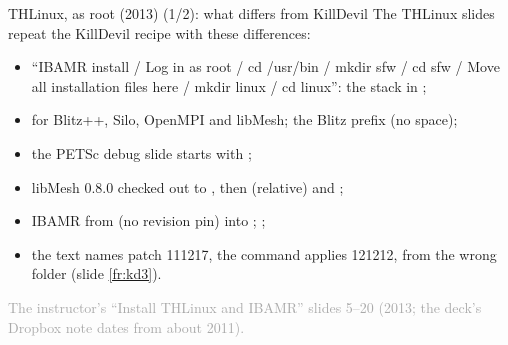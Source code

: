 \documentclass[aspectratio=169,11pt]{beamer}
\newcommand{\sourcecredit}[1]{\vfill\begin{flushright}\tiny\textcolor{DarkGray}{#1}\end{flushright}}
\begin{document}
\begin{frame}{THLinux, as root (2013) (1/2): what differs from KillDevil}
\label{fr:throot}
\small The THLinux slides repeat the KillDevil recipe with these differences:
\begin{itemize}\setlength{\itemsep}{2pt}
  \item ``IBAMR install / Log in as root / cd /usr/bin / mkdir sfw / cd sfw / Move all installation files here / mkdir linux / cd linux'': the stack in ;
  \item {} for Blitz++, Silo, OpenMPI and libMesh; the Blitz prefix  (no space);
  \item the PETSc debug slide starts with ;
  \item libMesh 0.8.0 checked out to , then  (relative) and ;
  \item IBAMR from  (no revision pin) into ; ;
  \item the text names patch 111217, the command applies 121212, from the wrong folder (slide \ref{fr:kd3}).
\end{itemize}
\sourcecredit{The instructor's ``Install THLinux and IBAMR'' slides 5--20 (2013; the deck's Dropbox note dates from about 2011).}
\end{frame}
\end{document}
